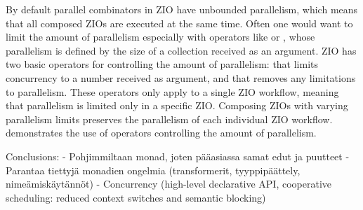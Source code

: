 

By default parallel combinators in ZIO have unbounded parallelism, which means that all composed ZIOs are executed at the same time. Often one would want to limit the amount of parallelism especially with operators like  or , whose parallelism is defined by the size of a collection received as an argument. ZIO has two basic operators for controlling the amount of parallelism:  that limits concurrency to a number received as argument, and  that removes any limitations to parallelism. These operators only apply to a single ZIO workflow, meaning that parallelism is limited only in a specific ZIO. Composing ZIOs with varying parallelism limits preserves the parallelism of each individual ZIO workflow.  demonstrates the use of operators controlling the amount of parallelism.



Conclusions: 
- Pohjimmiltaan monad, joten pääasiassa samat edut ja puutteet
- Parantaa tiettyjä monadien ongelmia (transformerit, tyyppipäättely, nimeämiskäytännöt)
- Concurrency (high-level declarative API, cooperative scheduling: reduced context switches and semantic blocking)






